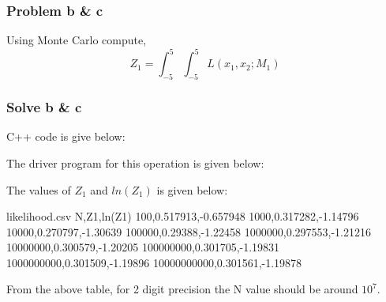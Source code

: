 \documentclass{article}
\begin{document}
\subsubsection*{Problem b \& c}
Using Monte Carlo compute, 
$$Z_1 = \int_{-5}^{5}\int_{-5}^{5} L(x_1, x_2; M_1)$$
\subsubsection*{Solve b \& c}
C++ code is give below: 

The driver program for this operation is given below:

The values of $Z_1$ and $ln(Z_1)$ is given below: 
\begin{center}

\begin{filecontents}{likelihood.csv}
N,Z1,ln(Z1)
100,0.517913,-0.657948
1000,0.317282,-1.14796
10000,0.270797,-1.30639
100000,0.29388,-1.22458
1000000,0.297553,-1.21216
10000000,0.300579,-1.20205
100000000,0.301705,-1.19831
1000000000,0.301509,-1.19896
10000000000,0.301561,-1.19878
\end{filecontents}

\pgfplotstabletypeset[
    dec sep align=S,    %
    precision=15,        %
    display columns/0/.style={
        column name=$N$
    },
    display columns/1/.style={column name=$Z_{1}$},
    display columns/2/.style={column name=$ln{Z_1}$},
    every head row/.style={before row=\toprule, after row=\midrule},
    every last row/.style={after row=\bottomrule},
    ] {\table}
\end{center}
From the above table, for 2 digit precision the N value should be around $10^7$.
\end{document}
